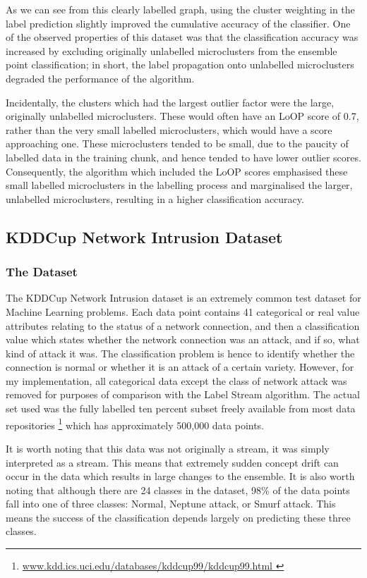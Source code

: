 \documentclass[12pt,a4paper,oneside]{report}
\begin{document}
As we can see from this clearly labelled graph, using the cluster weighting in the label prediction slightly improved the cumulative accuracy of the classifier.  One of the observed properties of this dataset was that the classification accuracy was increased by excluding originally unlabelled microclusters from the ensemble point classification; in short, the label propagation onto unlabelled microclusters degraded the performance of the algorithm. 

Incidentally, the clusters which had the largest outlier factor were the large, originally unlabelled microclusters. These would often have an LoOP score of 0.7, rather than the very small labelled microclusters, which would have a score approaching one. These microclusters tended to be small, due to the paucity of labelled data in the training chunk, and hence tended to have lower outlier scores. Consequently, the algorithm which included the LoOP scores emphasised these small labelled microclusters in the labelling process and marginalised the larger, unlabelled microclusters, resulting in a higher classification accuracy. 

\subsection*{KDDCup Network Intrusion Dataset}
\subsubsection*{The Dataset}

The KDDCup Network Intrusion dataset is an extremely common test dataset for Machine Learning problems. Each data point contains 41 categorical or real value attributes relating to the status of a network connection, and then a classification value which states whether the network connection was an attack, and if so, what kind of attack it was. The classification problem is hence to identify whether the connection is normal or whether it is an attack of a certain variety. However, for my implementation, all categorical data except the class of network attack was removed for purposes of comparison with the Label Stream algorithm. The actual set used was the fully labelled ten percent subset freely available from most data repositories \footnote{\url{ www.kdd.ics.uci.edu/databases/kddcup99/kddcup99.html } } which has approximately 500,000 data points.    

It is worth noting that this data was not originally a stream, it was simply interpreted as a stream. This means that extremely sudden concept drift can occur in the data which results in large changes to the ensemble. It is also worth noting that although there are 24 classes in the dataset, 98\(\%\) of the data points fall into one of three classes: Normal, Neptune attack, or Smurf attack. This means the success of the classification depends largely on predicting these three classes. 
\end{document}
